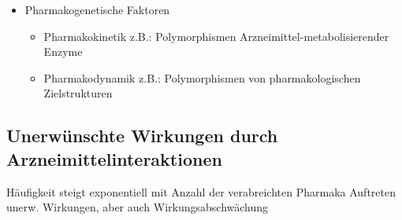 \documentclass[10pt,a4paper]{report}
\begin{document}
\begin{itemize}
\begin{itemize}
	\end{itemize}
	\item Pharmakogenetische Faktoren
	\begin{itemize}
		\item Pharmakokinetik	z.B.: Polymorphismen Arzneimittel-metabolisierender Enzyme
	 	\item Pharmakodynamik z.B.: Polymorphismen von pharmakologischen Zielstrukturen
	\end{itemize}
\end{itemize}
\subsection{Unerwünschte Wirkungen durch Arzneimittelinteraktionen}
Häufigkeit steigt exponentiell mit Anzahl der verabreichten Pharmaka
Auftreten unerw. Wirkungen, aber auch Wirkungsabschwächung
\end{document}
